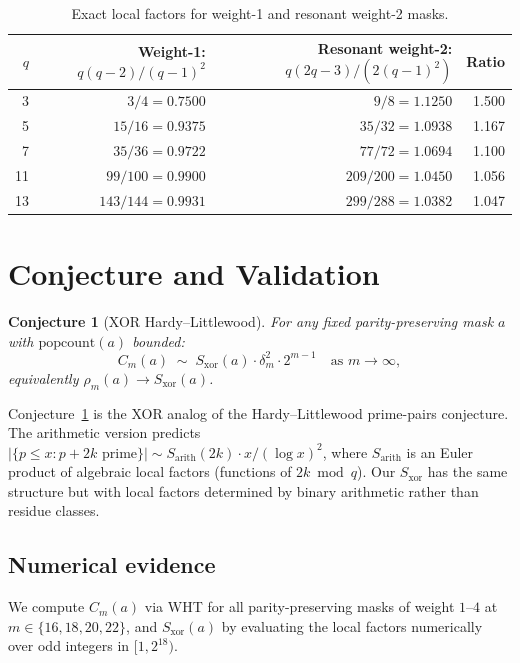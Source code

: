 \documentclass[12pt]{article}
\newtheorem{conjecture}[theorem]{Conjecture}
\begin{document}
\begin{table}[h]
\centering
\caption{Exact local factors for weight-1 and resonant weight-2 masks.}
\label{tab:localfactors}
\begin{tabular}{rrrr}
\toprule
$q$ & Weight-1: $q(q-2)/(q-1)^2$ & Resonant weight-2: $q(2q-3)/(2(q-1)^2)$ & Ratio \\
\midrule
3  & $3/4 = 0.7500$    & $9/8 = 1.1250$     & 1.500 \\
5  & $15/16 = 0.9375$  & $35/32 = 1.0938$   & 1.167 \\
7  & $35/36 = 0.9722$  & $77/72 = 1.0694$   & 1.100 \\
11 & $99/100 = 0.9900$ & $209/200 = 1.0450$ & 1.056 \\
13 & $143/144 = 0.9931$& $299/288 = 1.0382$ & 1.047 \\
\bottomrule
\end{tabular}
\end{table}

\section{Conjecture and Validation}
\label{sec:conjecture}

\begin{conjecture}[XOR Hardy--Littlewood]
\label{conj:main}
For any fixed parity-preserving mask $a$ with $\mathrm{popcount}(a)$ bounded:
\[
  C_m(a) \;\sim\; S_{\mathrm{xor}}(a) \cdot \delta_m^2 \cdot 2^{m-1}
  \quad\text{as } m \to \infty,
\]
equivalently $\rho_m(a) \to S_{\mathrm{xor}}(a)$.
\end{conjecture}

Conjecture~\ref{conj:main} is the XOR analog of the Hardy--Littlewood
prime-pairs conjecture.  The arithmetic version predicts
$|\{p \leq x : p+2k \text{ prime}\}| \sim S_{\mathrm{arith}}(2k) \cdot x/(\log x)^2$,
where $S_{\mathrm{arith}}$ is an Euler product of algebraic local factors
(functions of $2k \bmod q$).  Our $S_{\mathrm{xor}}$ has the same structure
but with local factors determined by binary arithmetic rather than residue classes.

\subsection{Numerical evidence}

We compute $C_m(a)$ via WHT for all parity-preserving masks of weight $1$--$4$
at $m \in \{16,18,20,22\}$, and $S_{\mathrm{xor}}(a)$ by evaluating the local
factors numerically over odd integers in $[1,2^{18})$.
\end{document}
